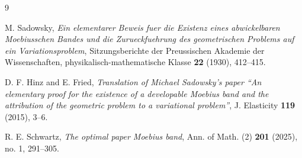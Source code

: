 \documentclass[11pt]{article}
\begin{document}
\begin{thebibliography}{9}

M. Sadowsky,
\emph{Ein elementarer Beweis fuer die Existenz eines abwickelbaren Moebiusschen Bandes und die Zurueckfuehrung des geometrischen Problems auf ein Variationsproblem},
Sitzungsberichte der Preussischen Akademie der Wissenschaften, physikalisch-mathematische Klasse \textbf{22} (1930), 412--415.

D. F. Hinz and E. Fried,
\emph{Translation of Michael Sadowsky's paper ``An elementary proof for the existence of a developable Moebius band and the attribution of the geometric problem to a variational problem''},
J. Elasticity \textbf{119} (2015), 3--6.

R. E. Schwartz,
\emph{The optimal paper Moebius band},
Ann. of Math. (2) \textbf{201} (2025), no. 1, 291--305.

\end{thebibliography}
\end{document}
